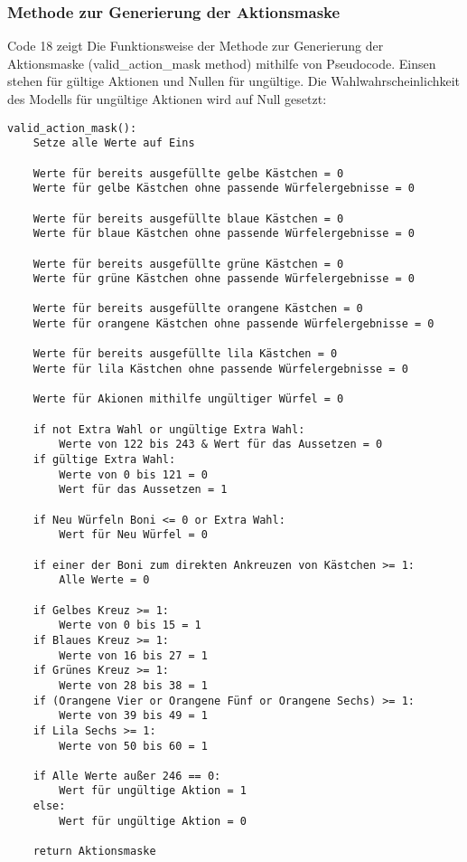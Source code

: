 \subsubsection{Methode zur Generierung der Aktionsmaske}
Code 18 zeigt Die Funktionsweise der Methode zur Generierung der Aktionsmaske (valid\_action\_mask method) mithilfe von Pseudocode. Einsen stehen für gültige Aktionen und Nullen für ungültige. Die Wahlwahrscheinlichkeit des Modells für ungültige Aktionen wird auf Null gesetzt:
\vspace{0.5cm}
\begin{lstlisting}[caption={Methode zur Generierung der Aktionsmaske}]
valid_action_mask():
	Setze alle Werte auf Eins
	
	Werte für bereits ausgefüllte gelbe Kästchen = 0
	Werte für gelbe Kästchen ohne passende Würfelergebnisse = 0
	
	Werte für bereits ausgefüllte blaue Kästchen = 0
	Werte für blaue Kästchen ohne passende Würfelergebnisse = 0
	
	Werte für bereits ausgefüllte grüne Kästchen = 0
	Werte für grüne Kästchen ohne passende Würfelergebnisse = 0
	
	Werte für bereits ausgefüllte orangene Kästchen = 0
	Werte für orangene Kästchen ohne passende Würfelergebnisse = 0
	
	Werte für bereits ausgefüllte lila Kästchen = 0
	Werte für lila Kästchen ohne passende Würfelergebnisse = 0
	
	Werte für Akionen mithilfe ungültiger Würfel = 0
	
	if not Extra Wahl or ungültige Extra Wahl:
		Werte von 122 bis 243 & Wert für das Aussetzen = 0
	if gültige Extra Wahl:
		Werte von 0 bis 121 = 0
		Wert für das Aussetzen = 1
	
	if Neu Würfeln Boni <= 0 or Extra Wahl:
		Wert für Neu Würfel = 0
	
	if einer der Boni zum direkten Ankreuzen von Kästchen >= 1:
		Alle Werte = 0
	
	if Gelbes Kreuz >= 1:
		Werte von 0 bis 15 = 1
	if Blaues Kreuz >= 1:
		Werte von 16 bis 27 = 1
	if Grünes Kreuz >= 1:
		Werte von 28 bis 38 = 1
	if (Orangene Vier or Orangene Fünf or Orangene Sechs) >= 1:
		Werte von 39 bis 49 = 1
	if Lila Sechs >= 1:
		Werte von 50 bis 60 = 1
	
	if Alle Werte außer 246 == 0:
		Wert für ungültige Aktion = 1
	else:
		Wert für ungültige Aktion = 0
		
	return Aktionsmaske
\end{lstlisting}
